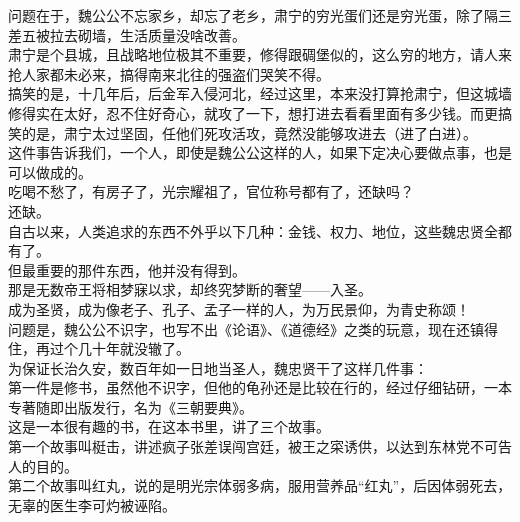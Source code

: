 \begin{multicols}{\theparacolNo}
问题在于，魏公公不忘家乡，却忘了老乡，肃宁的穷光蛋们还是穷光蛋，除了隔三差五被拉去砌墙，生活质量没啥改善。\\

肃宁是个县城，且战略地位极其不重要，修得跟碉堡似的，这么穷的地方，请人来抢人家都未必来，搞得南来北往的强盗们哭笑不得。\\

搞笑的是，十几年后，后金军入侵河北，经过这里，本来没打算抢肃宁，但这城墙修得实在太好，忍不住好奇心，就攻了一下，想打进去看看里面有多少钱。而更搞笑的是，肃宁太过坚固，任他们死攻活攻，竟然没能够攻进去（进了白进）。\\

这件事告诉我们，一个人，即使是魏公公这样的人，如果下定决心要做点事，也是可以做成的。\\

吃喝不愁了，有房子了，光宗耀祖了，官位称号都有了，还缺吗？\\

还缺。\\

自古以来，人类追求的东西不外乎以下几种：金钱、权力、地位，这些魏忠贤全都有了。\\

但最重要的那件东西，他并没有得到。\\

那是无数帝王将相梦寐以求，却终究梦断的奢望——入圣。\\

成为圣贤，成为像老子、孔子、孟子一样的人，为万民景仰，为青史称颂！\\

问题是，魏公公不识字，也写不出《论语》、《道德经》之类的玩意，现在还镇得住，再过个几十年就没辙了。\\

为保证长治久安，数百年如一日地当圣人，魏忠贤干了这样几件事：\\

第一件是修书，虽然他不识字，但他的龟孙还是比较在行的，经过仔细钻研，一本专著随即出版发行，名为《三朝要典》。\\

这是一本很有趣的书，在这本书里，讲了三个故事。\\

第一个故事叫梃击，讲述疯子张差误闯宫廷，被王之寀诱供，以达到东林党不可告人的目的。\\

第二个故事叫红丸，说的是明光宗体弱多病，服用营养品“红丸”，后因体弱死去，无辜的医生李可灼被诬陷。\\


\end{multicols}
